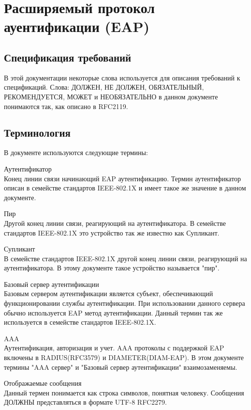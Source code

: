 \section{Расширяемый протокол ауентификации (EAP)} 

\subsection{Спецификация требований}

В этой документации некоторые слова используется для описания требований к спецификаций. Слова: ДОЛЖЕН, НЕ ДОЛЖЕН, ОБЯЗАТЕЛЬНЫЙ, РЕКОМЕНДУЕТСЯ, МОЖЕТ и НЕОБЯЗАТЕЛЬНО в данном документе понимаются так, как описано в RFC2119.

\subsection{Терминология}

В документе используются следующие термины:

Аутентификатор \\ Конец линии связи начинающий EAP аутентификацию. Термин аутентификатор описан в семействе стандартов IEEE-802.1X и имеет такое же значение в данном документе.

Пир \\ Другой конец линии связи, реагирующий на аутентификатора. В семействе стандартов IEEE-802.1X это устройство так же известно как Супликант.

Супликант \\  В семействе стандартов IEEE-802.1X другой конец линии связи, реагирующий на аутентификатора. В этому документе такое устройство называется "пир".

Базовый сервер аутентификации \\ Базовым сервером аутентификации является субъект, обеспечивающий функционировании службы аутентификации. При использовании данного сервера обычно используется EAP метод аутентификации. Данный термин так же используется в семействе стандартов IEEE-802.1X.

AAA \\ Аутентификация, авторизация и учет. AAA протоколы с поддержкой EAP включены в RADIUS(RFC3579) и DIAMETER(DIAM-EAP). В этом документе термины "AAA сервер" и "Базовый сервер аутентификации" взаимозаменяемы.

Отображаемые сообщения \\ Данный термен понимается как строка символов, понятная человеку. Сообщения ДОЛЖНЫ представляться в формате UTF-8 RFC2279.


